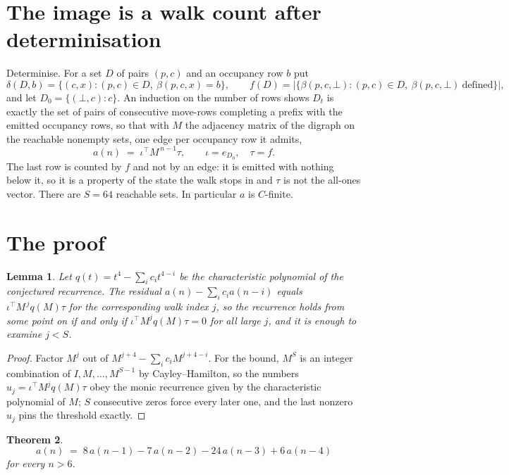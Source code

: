 \documentclass[11pt,a4paper]{article}
\theoremstyle{plain}
\newtheorem{theorem}{Theorem}
\newtheorem{lemma}[theorem]{Lemma}
\theoremstyle{definition}
\begin{document}
\section{The image is a walk count after determinisation}

Determinise. For a set $D$ of pairs $(p,c)$ and an occupancy row $b$ put
\[
\delta(D,b)=\{(c,x):(p,c)\in D,\ \beta(p,c,x)=b\},\qquad
f(D)=\bigl|\{\beta(p,c,\bot):(p,c)\in D,\ \beta(p,c,\bot)\ \text{defined}\}\bigr| ,
\]
and let $D_0=\{(\bot,c):c\}$. An induction on the number of rows shows $D_t$ is exactly the
set of pairs of consecutive move-rows completing a prefix with the emitted occupancy rows, so
that with $M$ the adjacency matrix of the digraph on the reachable nonempty sets, one edge per
occupancy row it admits,
\[
a(n)\;=\;\iota^{\!\top}M^{\,n-1}\tau,\qquad \iota=e_{D_0},\quad \tau=f .
\]
The last row is counted by $f$ and not by an edge: it is emitted with nothing below it, so it
is a property of the state the walk stops in and $\tau$ is not the all-ones vector. There are
$S=64$ reachable sets. In particular $a$ is $C$-finite.

\section{The proof}

\begin{lemma}\label{lem:crit}
Let $q(t)=t^{4}-\sum_i c_it^{4-i}$ be the characteristic polynomial of the
conjectured recurrence. The residual $a(n)-\sum_ic_ia(n-i)$ equals
$\iota^{\!\top}M^{\,j}q(M)\tau$ for the corresponding walk index $j$, so the recurrence
holds from some point on if and only if $\iota^{\!\top}M^{j}q(M)\tau=0$ for all large $j$,
and it is enough to examine $j<S$.
\end{lemma}

\begin{proof}
Factor $M^{j}$ out of $M^{j+4}-\sum_ic_iM^{j+4-i}$. For the bound, $M^{S}$
is an integer combination of $I,M,\dots,M^{S-1}$ by Cayley--Hamilton, so the numbers
$u_j=\iota^{\!\top}M^{j}q(M)\tau$ obey the monic recurrence given by the characteristic
polynomial of $M$; $S$ consecutive zeros force every later one, and the last nonzero $u_j$
pins the threshold exactly.
\end{proof}

\begin{theorem}
\[
a(n)\;=\;8\,a(n-1) - 7\,a(n-2) - 24\,a(n-3) + 6\,a(n-4)
\]
for every $n>6$.
\end{theorem}
\end{document}
